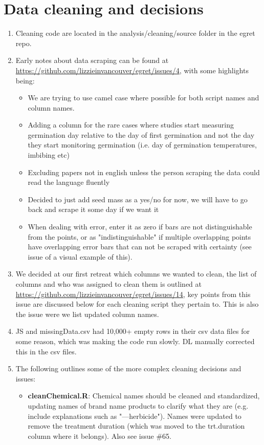 \documentclass{article}[12pt]
\begin{document}
\section*{Data cleaning and decisions}
\begin{enumerate}
\item Cleaning code are located in the analysis/cleaning/source folder in the egret repo.
\item Early notes about data scraping can be found at \url{https://github.com/lizzieinvancouver/egret/issues/4}, with some highlights being:
\begin{itemize}
\item We are trying to use camel case where possible for both script names and column names. 
\item Adding a column for the rare cases where studies start measuring germination day relative to the day of first germination and not the day they start monitoring germination (i.e. day of germination temperatures, imbibing etc)
\item Excluding papers not in english unless the person scraping the data could read the language fluently 
\item Decided to just add seed mass as a yes/no for now, we will have to go back and scrape it some day if we want it
\item When dealing with error, enter it as zero if bars are not distinguishable from the points, or as "indistinguishable" if multiple overlapping points have overlapping error bars that can not be scraped with certainty (see issue of a visual example of this).
\end{itemize}
\item We decided at our first retreat which columns we wanted to clean, the list of columns and who was assigned to clean them is outlined at \url{https://github.com/lizzieinvancouver/egret/issues/14}, key points from this issue are discussed below for each cleaning script they pertain to. This is also the issue were we list updated column names.
\item JS and missingData.csv had 10,000+ empty rows in their csv data files for some reason, which was making the code run slowly. DL manually corrected this in the csv files.
\item The following outlines some of the more complex cleaning decisions and issues:
\begin{itemize}
\item \textbf{cleanChemical.R}: Chemical names should be cleaned and standardized, updating names of brand name products to clarify what they are (e.g. include explanations such as "---herbicide"). Names were updated to remove the treatment duration (which was moved to the trt.duration column where it belongs). Also see issue \#65.

\end{itemize}
\end{enumerate}
\end{document}
